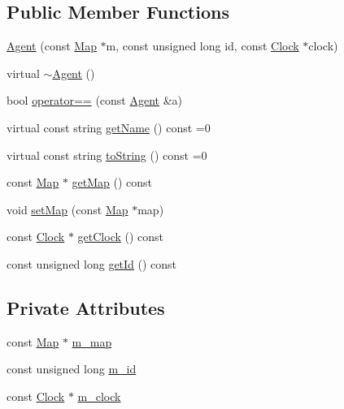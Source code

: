 \subsection*{Public Member Functions}
\begin{DoxyCompactItemize}
\item 
\hyperlink{class_agent_a0ad923f2f9966b65a5d908cb9da4217c}{Agent} (const \hyperlink{class_map}{Map} $\ast$m, const unsigned long id, const \hyperlink{class_clock}{Clock} $\ast$clock)
\item 
virtual \hyperlink{class_agent_a4feb26df1cf81760a0e411e393c24d4e}{$\sim$\+Agent} ()
\item 
bool \hyperlink{class_agent_afa2b3a408bb0694aea46fb2bb59bacf7}{operator==} (const \hyperlink{class_agent}{Agent} \&a)
\item 
virtual const string \hyperlink{class_agent_afe6c72d91baf9ee4fe77ea1ed7fef3ba}{get\+Name} () const =0
\item 
virtual const string \hyperlink{class_agent_a44f291596d10c7878b0641d6ec156328}{to\+String} () const =0
\item 
const \hyperlink{class_map}{Map} $\ast$ \hyperlink{class_agent_ad1870edeea33b059eca75079be2eb002}{get\+Map} () const
\item 
void \hyperlink{class_agent_a87a661874cffb03fa9e474e872810260}{set\+Map} (const \hyperlink{class_map}{Map} $\ast$map)
\item 
const \hyperlink{class_clock}{Clock} $\ast$ \hyperlink{class_agent_af80a21a067d04788c23d719d07b04038}{get\+Clock} () const
\item 
const unsigned long \hyperlink{class_agent_a51d2d781636f524dc151f3da10955613}{get\+Id} () const
\end{DoxyCompactItemize}
\subsection*{Private Attributes}
\begin{DoxyCompactItemize}
\item 
const \hyperlink{class_map}{Map} $\ast$ \hyperlink{class_agent_ab24d62bbfc22946d0c72221c8a43f04a}{m\+\_\+map}
\item 
const unsigned long \hyperlink{class_agent_ad1f52e164c2a829ef4418940567d6e37}{m\+\_\+id}
\item 
const \hyperlink{class_clock}{Clock} $\ast$ \hyperlink{class_agent_a534f22ebb0573aa1d58d274632e592cf}{m\+\_\+clock}
\end{DoxyCompactItemize}


